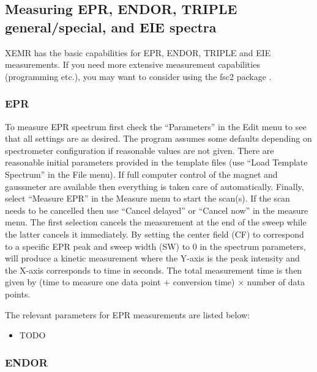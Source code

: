 \documentclass[byrevtex,amssymb,aps,pra,floatfix,letterpaper]{revtex4}
\begin{document}
\subsection{Measuring EPR, ENDOR, TRIPLE general/special, and EIE spectra}

XEMR has the basic capabilities for EPR, ENDOR, TRIPLE and EIE measurements. If you need more extensive measurement capabilities (programming etc.), you may want to consider using the fsc2 package \cite{fsc2}.

\subsubsection{EPR}

To measure EPR spectrum first check the ``Parameters'' in the Edit menu to see that all settings are as desired. The program assumes some defaults depending on spectrometer configuration if reasonable values are not given. There are reasonable initial parameters provided in the template files (use ``Load Template Spectrum'' in the File menu). If full computer control of the magnet and gaussmeter are available then everything is taken care of automatically. Finally, select ``Measure EPR'' in the Measure menu to start the scan(s). If the scan needs to be cancelled then use ``Cancel delayed'' or ``Cancel now'' in the measure menu. The first selection cancels the measurement at the end of the sweep while the latter cancels it immediately. By setting the center field (CF) to correspond to a specific EPR peak and sweep width (SW) to 0 in the spectrum parameters, will produce a kinetic measurement where the Y-axis is the peak intensity and the X-axis corresponds to time in seconds. The total measurement time is then given by (time to measure one data point $+$ conversion time) $\times$ number of data points.

The relevant parameters for EPR measurements are listed below:

\begin{itemize}
\item TODO
\end{itemize}

\subsubsection{ENDOR}
\end{document}
